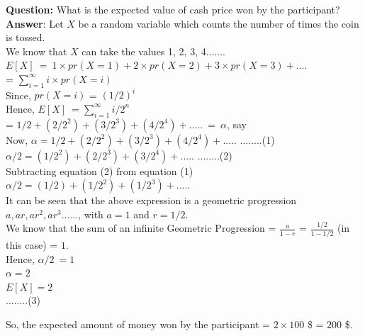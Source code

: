 \documentclass[11pt,fleqn]{book} %
\begin{document}
\textbf{Question:} What is the expected value of cash price won by the participant?\\

\textbf{Answer}: 
Let $X$ be a random variable which counts the number of times the coin is tossed.\\

We know that $X$ can take the values 1, 2, 3, 4.......\\
$E[X]\ =\ 1 \times pr(X=1) + 2 \times pr(X=2) + 3 \times pr(X=3)+ .... $\\

= $\sum_{i=1}^{\infty} i \times pr(X=i) $\\

Since, $ pr(X=i) $ = $(1/2)^i$\\

Hence, $E[X]\ = \sum_{i=1}^{\infty} i/2^{n} $\\

= $1/2+(2/2^2)+(3/2^3)+(4/2^4)+.....\ =\ \alpha$, say\\

Now, $\alpha = 1/2+(2/2^2)+(3/2^3)+(4/2^4)+.....$ \hspace{5mm} ........(1)\\

$\alpha/2 = (1/2^2)+(2/2^3)+(3/2^4)+.....$\hspace{5mm} ........(2)\\

Subtracting equation (2) from equation (1) \\

$\alpha/2= (1/2)+(1/2^2)+(1/2^3)+.....$\\

It can be seen that the above expression is a geometric progression $a,ar,ar^2,ar^3......$, with $a=1$ and $r=1/2$.\\

We know that the sum of an infinite Geometric Progression = $\frac{a}{1-r}$ = $\frac{1/2}{1-1/2}$ (in this case) = $1$. \\

Hence, $\alpha/2\ = 1$\\

$\alpha=2$\\

$E[X]=2$\\  	\hspace{5mm} ........(3)

So, the expected amount of money won by the participant = $2 \times 100$ \$ = $200$ \$.\\
\end{document}
